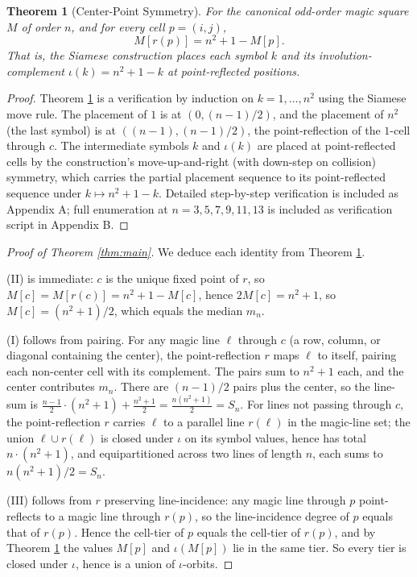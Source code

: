 \documentclass[11pt]{article}
\newtheorem{theorem}{Theorem}
\begin{document}
\begin{theorem}[Center-Point Symmetry]
\label{thm:cps}
For the canonical odd-order magic square $M$ of order $n$, and for every
cell $p = (i, j)$,
\[
M[r(p)] = n^2 + 1 - M[p].
\]
That is, the Siamese construction places each symbol $k$ and its
involution-complement $\iota(k) = n^2 + 1 - k$ at point-reflected positions.
\end{theorem}

\begin{proof}
Theorem \ref{thm:cps} is a verification by induction on $k = 1, \ldots, n^2$
using the Siamese move rule. The placement of $1$ is at $(0, (n-1)/2)$,
and the placement of $n^2$ (the last symbol) is at $((n-1), (n-1)/2)$, the
point-reflection of the $1$-cell through $c$. The intermediate symbols
$k$ and $\iota(k)$ are placed at point-reflected cells by the construction's
move-up-and-right (with down-step on collision) symmetry, which carries
the partial placement sequence to its point-reflected sequence under
$k \mapsto n^2 + 1 - k$. Detailed step-by-step verification is included as
Appendix A; full enumeration at $n = 3, 5, 7, 9, 11, 13$ is included as
verification script in Appendix B.
\end{proof}

\begin{proof}[Proof of Theorem \ref{thm:main}]
We deduce each identity from Theorem \ref{thm:cps}.

(II) is immediate: $c$ is the unique fixed point of $r$, so $M[c] = M[r(c)] = n^2 + 1 - M[c]$, hence $2 M[c] = n^2 + 1$, so $M[c] = (n^2+1)/2$, which equals the median $m_n$.

(I) follows from pairing. For any magic line $\ell$ through $c$ (a row, column, or diagonal containing the center), the point-reflection $r$ maps $\ell$ to itself, pairing each non-center cell with its complement. The pairs sum to $n^2 + 1$ each, and the center contributes $m_n$. There are $(n - 1)/2$ pairs plus the center, so the line-sum is
$\frac{n-1}{2} \cdot (n^2 + 1) + \frac{n^2 + 1}{2} = \frac{n (n^2 + 1)}{2} = S_n$.
For lines not passing through $c$, the point-reflection $r$ carries $\ell$ to a parallel line $r(\ell)$ in the magic-line set; the union $\ell \cup r(\ell)$ is closed under $\iota$ on its symbol values, hence has total $n \cdot (n^2 + 1)$, and equipartitioned across two lines of length $n$, each sums to $n(n^2+1)/2 = S_n$.

(III) follows from $r$ preserving line-incidence: any magic line through $p$ point-reflects to a magic line through $r(p)$, so the line-incidence degree of $p$ equals that of $r(p)$. Hence the cell-tier of $p$ equals the cell-tier of $r(p)$, and by Theorem \ref{thm:cps} the values $M[p]$ and $\iota(M[p])$ lie in the same tier. So every tier is closed under $\iota$, hence is a union of $\iota$-orbits.
\end{proof}
\end{document}
